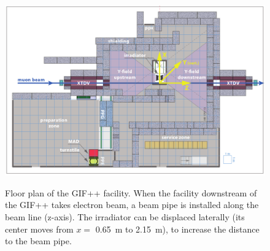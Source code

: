 	\begin{figure}[H]
		\centering
		\includegraphics[width = .75\linewidth]{fig/chapt5/GIFpp-Layout.png}\\
		\caption{\label{fig:GIFpp-Layout} Floor plan of the GIF++ facility. When the facility downstream of the GIF++ takes electron beam, a beam pipe is installed along the beam line (z-axis). The irradiator can be displaced laterally (its center moves from $x=$ \SI{0.65}{m} to \SI{2.15}{m}), to increase the distance to the beam pipe.}
	\end{figure}
	 
